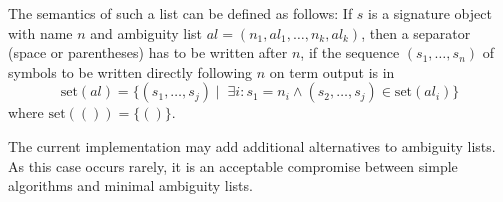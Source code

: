 The semantics of such a list can be defined as follows:
If $s$ is a signature object with name $n$ and ambiguity list 
$al=(n_1,al_1,\ldots,n_k,al_k)$,
then a separator (space or parentheses) has to be written
after $n$, if the sequence $(s_1,\dots,s_n)$ of symbols to be written
directly following $n$ on term output is in
\[
  \mbox{set}(al) = \{ (s_1,\dots,s_j)  \mid  \;
         \exists i: s_1 = n_i \land (s_2,\ldots,s_j) \in \mbox{set}(al_i) \}
\]
where $\mbox{set}(()) = \{ () \}$.

The current implementation may add additional alternatives to ambiguity
lists. As this case occurs rarely, it is an acceptable compromise
between simple algorithms and minimal ambiguity lists.